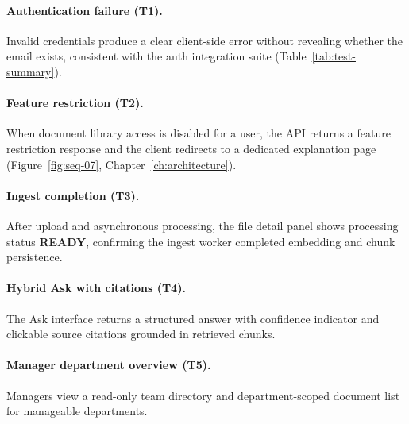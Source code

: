 \paragraph{Authentication failure (T1).}
Invalid credentials produce a clear client-side error without revealing whether the
email exists, consistent with the auth integration suite
(Table~\ref{tab:test-summary}).


\paragraph{Feature restriction (T2).}
When document library access is disabled for a user, the API returns a feature
restriction response and the client redirects to a dedicated explanation page
(Figure~\ref{fig:seq-07}, Chapter~\ref{ch:architecture}).


\paragraph{Ingest completion (T3).}
After upload and asynchronous processing, the file detail panel shows processing
status \textbf{READY}, confirming the ingest worker completed embedding and chunk
persistence.


\paragraph{Hybrid Ask with citations (T4).}
The Ask interface returns a structured answer with confidence indicator and
clickable source citations grounded in retrieved chunks.


\paragraph{Manager department overview (T5).}
Managers view a read-only team directory and department-scoped document list for
manageable departments.

